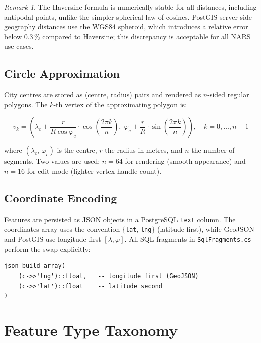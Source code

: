 \documentclass[12pt,a4paper]{article}
\theoremstyle{definition}
\theoremstyle{plain}
\theoremstyle{remark}
\newtheorem{remark}{Remark}[section]
\newcommand{\coord}[2]{(#1,\,#2)}
\begin{document}
\begin{remark}
The Haversine formula is numerically stable for all distances, including
antipodal points, unlike the simpler spherical law of cosines. PostGIS
server-side geography distances use the WGS84 spheroid, which introduces
a relative error below $0.3\,\%$ compared to Haversine; this discrepancy
is acceptable for all NARS use cases.
\end{remark}

\subsection{Circle Approximation}

City centres are stored as (centre, radius) pairs and rendered as
$n$-sided regular polygons. The $k$-th vertex of the approximating polygon is:

\begin{equation}
  v_k = \left(
    \lambda_c + \frac{r}{R\cos\varphi_c} \cdot \cos\!\left(\frac{2\pi k}{n}\right),\;
    \varphi_c + \frac{r}{R} \cdot \sin\!\left(\frac{2\pi k}{n}\right)
  \right), \quad k = 0, \ldots, n-1
  \label{eq:circle_vertex}
\end{equation}

where $\coord{\lambda_c}{\varphi_c}$ is the centre, $r$ the radius in
metres, and $n$ the number of segments. Two values are used:
$n = 64$ for rendering (smooth appearance) and $n = 16$ for edit mode
(lighter vertex handle count).

\subsection{Coordinate Encoding}

Features are persisted as JSON objects in a PostgreSQL \texttt{text} column.
The coordinates array uses the convention $\{$\texttt{lat}, \texttt{lng}$\}$
(latitude-first), while GeoJSON and PostGIS use longitude-first
$[\lambda, \varphi]$. All SQL fragments in \texttt{SqlFragments.cs} perform
the swap explicitly:

\begin{lstlisting}[style=sqlstyle, caption={Coordinate-order swap in SQL fragment}]
json_build_array(
    (c->>'lng')::float,   -- longitude first (GeoJSON)
    (c->>'lat')::float    -- latitude second
)
\end{lstlisting}

\section{Feature Type Taxonomy}
\label{sec:feature_types}
\end{document}
